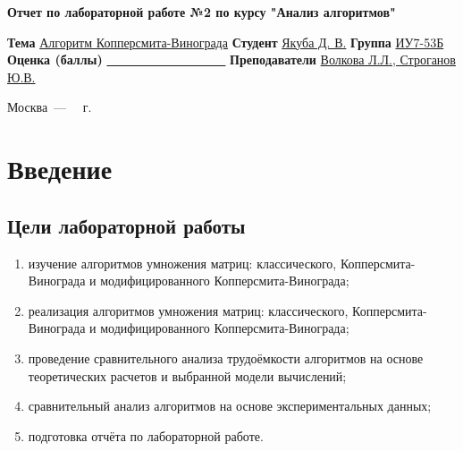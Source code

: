 \documentclass[12pt]{report}
\begin{document}
\begin{titlepage}
	
	\begin{center}
		\Large\textbf{Отчет по лабораторной работе №2 по курсу "Анализ алгоритмов"}\newline
	\end{center}
	
	\noindent\textbf{Тема} \underline{Алгоритм Копперсмита-Винограда}\newline\newline\newline
	\noindent\textbf{Студент} \underline{Якуба Д. В.}\newline\newline
	\noindent\textbf{Группа} \underline{ИУ7-53Б}\newline\newline
	\noindent\textbf{Оценка (баллы)} \underline{~~~~~~~~~~~~~~~~~~~}\newline\newline
	\noindent\textbf{Преподаватели} \underline{Волкова Л.Л., Строганов Ю.В.}\newline
	
	\begin{center}
		\vfill
		Москва~---~\the\year
		~г.
	\end{center}
\end{titlepage}

\tableofcontents

\newpage
\chapter*{Введение}
\section*{Цели лабораторной работы}
\begin{enumerate}
\item изучение алгоритмов умножения матриц: классического, Копперсмита-Винограда и модифицированного Копперсмита-Винограда;
\item реализация алгоритмов умножения матриц: классического, Копперсмита-Винограда и модифицированного Копперсмита-Винограда;
\item проведение сравнительного анализа трудоёмкости алгоритмов на основе теоретических расчетов и выбранной модели вычислений;
\item сравнительный анализ алгоритмов на основе экспериментальных данных;
\item подготовка отчёта по лабораторной работе.
\end{enumerate}
\end{document}
